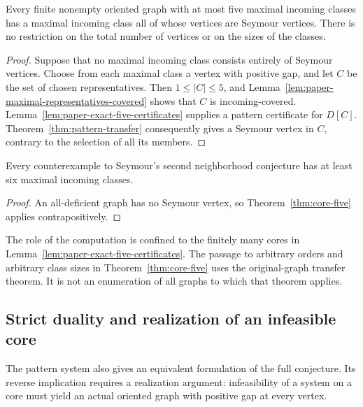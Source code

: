 \begin{theorem}
\label{thm:core-five}
Every finite nonempty oriented graph with at most five maximal incoming
classes has a maximal incoming class all of whose vertices are Seymour
vertices. There is no restriction on the total number of vertices or on
the sizes of the classes.
\end{theorem}
\begin{proof}
Suppose that no maximal incoming class consists entirely of Seymour
vertices. Choose from each maximal class a vertex with positive gap,
and let $C$ be the set of chosen representatives. Then $1\leq|C|\leq5$,
and Lemma~\ref{lem:paper-maximal-representatives-covered} shows that
$C$ is incoming-covered. Lemma~\ref{lem:paper-exact-five-certificates}
supplies a pattern certificate for $D[C]$.
Theorem~\ref{thm:pattern-transfer} consequently gives a Seymour vertex
in $C$, contrary to the selection of all its members.
\end{proof}

\begin{corollary}
\label{cor:paper-counterexample-six-incoming-classes}
Every counterexample to Seymour's second neighborhood conjecture has at
least six maximal incoming classes.
\end{corollary}
\begin{proof}
An all-deficient graph has no Seymour vertex, so
Theorem~\ref{thm:core-five} applies contrapositively.
\end{proof}

The role of the computation is confined to the finitely many cores in
Lemma~\ref{lem:paper-exact-five-certificates}. The passage to arbitrary
orders and arbitrary class sizes in Theorem~\ref{thm:core-five} uses the
original-graph transfer theorem. It is not an enumeration of all graphs
to which that theorem applies.

\subsection{Strict duality and realization of an infeasible core}

The pattern system also gives an equivalent formulation of the full
conjecture. Its reverse implication requires a realization argument:
infeasibility of a system on a core must yield an actual oriented graph
with positive gap at every vertex.

